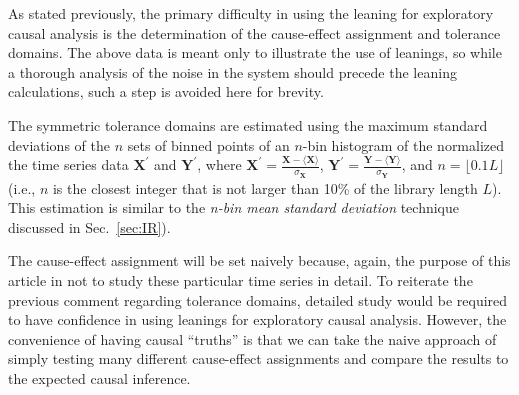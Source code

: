 \documentclass[a4paper,11pt,twocolumn]{article}
\begin{document}
As stated previously, the primary difficulty in using the leaning for exploratory causal analysis is the determination of the cause-effect assignment and tolerance domains.  The above data is meant only to illustrate the use of leanings, so while a thorough analysis of the noise in the system should precede the leaning calculations, such a step is avoided here for brevity.  

The symmetric tolerance domains are estimated using the maximum standard deviations of the $n$ sets of binned points of an $n$-bin histogram of the normalized the time series data $\mathbf{X}^\prime$ and $\mathbf{Y}^\prime$, where $\mathbf{X}^\prime = \frac{\mathbf{X}-\langle \mathbf{X} \rangle}{\sigma_\mathbf{X}}$, $\mathbf{Y}^\prime = \frac{\mathbf{Y}-\langle \mathbf{Y} \rangle}{\sigma_\mathbf{Y}}$, and $n=\lfloor 0.1L\rfloor$ (i.e., $n$ is the closest integer that is not larger than 10\% of the library length $L$).  This estimation is similar to the {\em n-bin mean standard deviation} technique discussed in Sec.\ \ref{sec:IR}).

The cause-effect assignment will be set naively because, again, the purpose of this article in not to study these particular time series in detail.  To reiterate the previous comment regarding tolerance domains, detailed study would be required to have confidence in using leanings for exploratory causal analysis.  However, the convenience of having causal ``truths'' is that we can take the naive approach of simply testing many different cause-effect assignments and compare the results to the expected causal inference.
\end{document}
